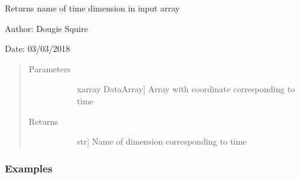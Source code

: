 \documentclass[letterpaper,10pt,english]{sphinxmanual}
\begin{document}
\begin{fulllineitems}
\label{\detokenize{utils_doc:utils.get_time_name}}
Returns name of time dimension in input array

\begin{DUlineblock}{0em}
\item[] Author: Dougie Squire
\item[] Date: 03/03/2018
\end{DUlineblock}
\begin{quote}\begin{description}
\item[{Parameters}] \leavevmode\begin{description}
\item[{}] \leavevmode{[}xarray DataArray{]}
Array with coordinate corresponding to time

\end{description}

\item[{Returns}] \leavevmode\begin{description}
\item[{}] \leavevmode{[}str{]}
Name of dimension corresponding to time

\end{description}

\end{description}\end{quote}
\subsubsection*{Examples}


\end{fulllineitems}
\end{document}
